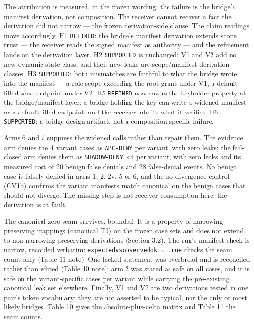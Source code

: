 \documentclass[
  10pt,
]{article}
\renewcommand{\_}{\origunderscore\allowbreak}
\begin{document}
The attribution is measured, in the frozen wording: the failure is the
bridge's manifest derivation, not composition. The receiver cannot
recover a fact the derivation did not narrow --- the frozen
derivation-side clause. The claim readings move accordingly. H1
\texttt{REFINED}: the bridge's manifest derivation extends scope trust
--- the receiver reads the signed manifest as authority --- and the
refinement lands on the derivation layer. H2 \texttt{SUPPORTED} is
unchanged: V1 and V2 add no new dynamic-state class, and their new leaks
are scope/manifest-derivation classes. H3 \texttt{SUPPORTED}: both
mismatches are faithful to what the bridge wrote into the manifest --- a
role scope exceeding the root grant under V1, a default-filled send
endpoint under V2. H5 \texttt{REFINED} now covers the keyholder property
at the bridge/manifest layer: a bridge holding the key can write a
widened manifest or a default-filled endpoint, and the receiver admits
what it verifies. H6 \texttt{SUPPORTED}: a bridge-design artifact, not a
composition-specific failure.

Arms 6 and 7 suppress the widened calls rather than repair them. The
evidence arm denies the 4 variant cases as \texttt{APC-DENY} per
variant, with zero leaks; the fail-closed arm denies them as
\texttt{SHADOW-DENY} ×4 per variant, with zero leaks and its measured
cost of 20 benign false denials and 28 false-denial events. No benign
case is falsely denied in arms 1, 2, 2v, 5 or 6, and the no-divergence
control (CV1b) confirms the variant manifests match canonical on the
benign cases that should not diverge. The missing step is not receiver
consumption here; the derivation is at fault.

The canonical zero seam survives, bounded. It is a property of
narrowing-preserving mappings (canonical T0) on the frozen case sets and
does not extend to non-narrowing-preserving derivations (Section 3.2).
The run's manifest check is narrow, recorded verbatim:
\texttt{expected\_vs\_observed\_ok\ =\ true} checks the seam count only
(Table 11 note). One locked statement was overbroad and is reconciled
rather than edited (Table 10 note): arm 2 was stated as safe on all
cases, and it is safe on the variant-specific cases per variant while
carrying the pre-existing canonical leak set elsewhere. Finally, V1 and
V2 are two derivations tested in one pair's token vocabulary; they are
not asserted to be typical, nor the only or most likely bridges. Table
10 gives the absolute-plus-delta matrix and Table 11 the seam counts.
\end{document}
